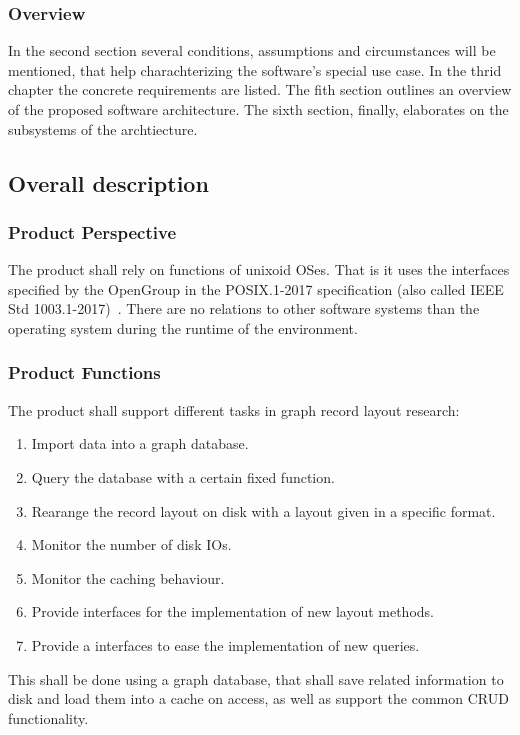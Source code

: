 	\subsubsection{Overview}
		In the second section several conditions, assumptions and circumstances will be mentioned, that help charachterizing the software's special use case. In the thrid chapter the concrete requirements are listed. The fith section outlines an overview of the proposed software architecture. The sixth section, finally, elaborates on the subsystems of the archtiecture.

		
\subsection{Overall description}
	\subsubsection{Product Perspective}
		The product shall rely on functions of unixoid OSes. 
		That is it uses the interfaces specified by the OpenGroup in the POSIX.1-2017 specification (also called IEEE Std 1003.1-2017)~\autocite{posix}.
		There are no relations to other software systems than the operating system during the runtime of the environment.

	\subsubsection{Product Functions}
	The product shall support different tasks in graph record layout research: 
		\begin{enumerate}
		 \item Import data into a graph database.
		 \item Query the database with a certain fixed function.
		 \item Rearange the record layout on disk with a layout given in a specific format.
		 \item Monitor the number of disk IOs.
		 \item Monitor the caching behaviour.
		 \item Provide interfaces for the implementation of new layout methods.
		 \item Provide a interfaces to ease the implementation of new queries.
		\end{enumerate}
		
        This shall be done using a graph database, that shall save related information to disk and load them into a cache on access, as well as support the common CRUD functionality. \\
        

